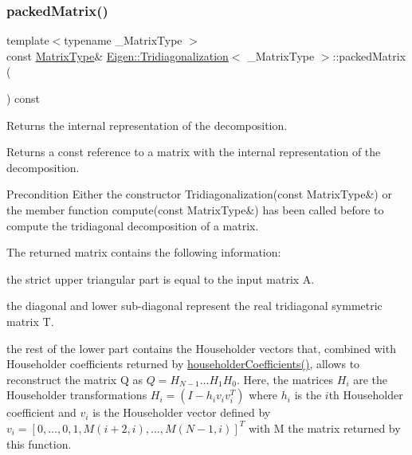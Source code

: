 \subsubsection{\texorpdfstring{packedMatrix()}{packedMatrix()}}
{\footnotesize\ttfamily template$<$typename \+\_\+\+Matrix\+Type $>$ \\
const \mbox{\hyperlink{class_eigen_1_1_tridiagonalization_add0f4b2216d0ea8ee0f7d8525deaf0a9}{Matrix\+Type}}\& \mbox{\hyperlink{class_eigen_1_1_tridiagonalization}{Eigen\+::\+Tridiagonalization}}$<$ \+\_\+\+Matrix\+Type $>$\+::packed\+Matrix (\begin{DoxyParamCaption}{ }\end{DoxyParamCaption}) const\hspace{0.3cm}{\ttfamily [inline]}}



Returns the internal representation of the decomposition. 

\begin{DoxyReturn}{Returns}
a const reference to a matrix with the internal representation of the decomposition.
\end{DoxyReturn}
\begin{DoxyPrecond}{Precondition}
Either the constructor Tridiagonalization(const Matrix\+Type\&) or the member function compute(const Matrix\+Type\&) has been called before to compute the tridiagonal decomposition of a matrix.
\end{DoxyPrecond}
The returned matrix contains the following information\+:
\begin{DoxyItemize}
\item the strict upper triangular part is equal to the input matrix A.
\item the diagonal and lower sub-\/diagonal represent the real tridiagonal symmetric matrix T.
\item the rest of the lower part contains the Householder vectors that, combined with Householder coefficients returned by \mbox{\hyperlink{class_eigen_1_1_tridiagonalization_ac95b4e43dcf6c3c5074b8bea4fc67887}{householder\+Coefficients()}}, allows to reconstruct the matrix Q as $ Q = H_{N-1} \ldots H_1 H_0 $. Here, the matrices $ H_i $ are the Householder transformations $ H_i = (I - h_i v_i v_i^T) $ where $ h_i $ is the $ i $th Householder coefficient and $ v_i $ is the Householder vector defined by $ v_i = [ 0, \ldots, 0, 1, M(i+2,i), \ldots, M(N-1,i) ]^T $ with M the matrix returned by this function.
\end{DoxyItemize}

